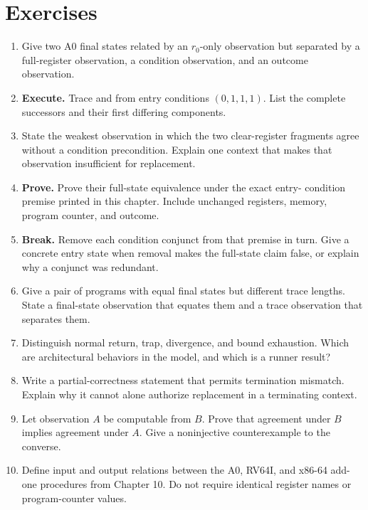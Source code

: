 \section{Exercises}

\begin{enumerate}
\item Give two A0 final states related by an \(r_0\)-only observation but
separated by a full-register observation, a condition observation, and an
outcome observation.

\item \textbf{Execute.} Trace  and
 from entry conditions \((0,1,1,1)\). List the complete
successors and their first differing components.

\item State the weakest observation in which the two clear-register fragments
agree without a condition precondition. Explain one context that makes that
observation insufficient for replacement.

\item \textbf{Prove.} Prove their full-state equivalence under the exact entry-
condition premise printed in this chapter. Include unchanged registers,
memory, program counter, and outcome.

\item \textbf{Break.} Remove each condition conjunct from that premise in
turn. Give a concrete entry state when removal makes the full-state claim
false, or explain why a conjunct was redundant.

\item Give a pair of programs with equal final states but different trace
lengths. State a final-state observation that equates them and a trace
observation that separates them.

\item Distinguish normal return, trap, divergence, and bound exhaustion. Which
are architectural behaviors in the model, and which is a runner result?

\item Write a partial-correctness statement that permits termination mismatch.
Explain why it cannot alone authorize replacement in a terminating context.

\item Let observation \(A\) be computable from \(B\). Prove that agreement
under \(B\) implies agreement under \(A\). Give a noninjective counterexample
to the converse.

\item Define input and output relations between the A0, RV64I, and x86-64 add-
one procedures from Chapter 10. Do not require identical register names or
program-counter values.


\end{enumerate}
